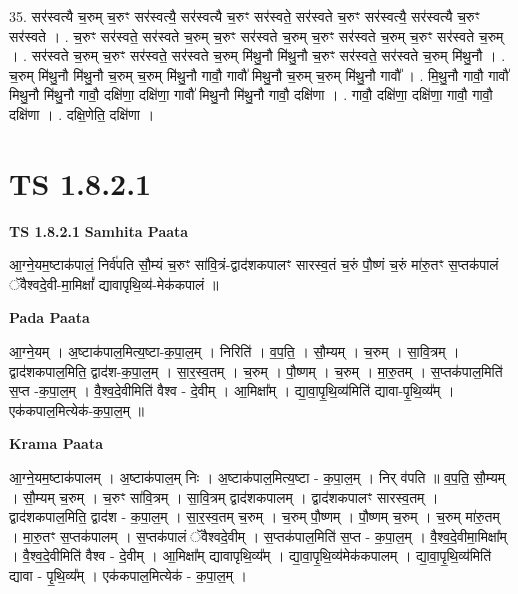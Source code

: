 \documentclass[17pt]{extarticle}
\begin{document}
35. सर॑स्वत्यै च॒रुम् च॒रुꣳ सर॑स्वत्यै॒ सर॑स्वत्यै च॒रुꣳ सर॑स्वते॒ सर॑स्वते च॒रुꣳ सर॑स्वत्यै॒ सर॑स्वत्यै च॒रुꣳ सर॑स्वते । . च॒रुꣳ सर॑स्वते॒ सर॑स्वते च॒रुम् च॒रुꣳ सर॑स्वते च॒रुम् च॒रुꣳ सर॑स्वते च॒रुम् च॒रुꣳ सर॑स्वते च॒रुम् । . सर॑स्वते च॒रुम् च॒रुꣳ सर॑स्वते॒ सर॑स्वते च॒रुम् मि॑थु॒नौ मि॑थु॒नौ च॒रुꣳ सर॑स्वते॒ सर॑स्वते च॒रुम् मि॑थु॒नौ । . च॒रुम् मि॑थु॒नौ मि॑थु॒नौ च॒रुम् च॒रुम् मि॑थु॒नौ गावौ॒ गावौ॑ मिथु॒नौ च॒रुम् च॒रुम् मि॑थु॒नौ गावौ᳚ । . मि॒थु॒नौ गावौ॒ गावौ॑ मिथु॒नौ मि॑थु॒नौ गावौ॒ दक्षि॑णा॒ दक्षि॑णा॒ गावौ॑ मिथु॒नौ मि॑थु॒नौ गावौ॒ दक्षि॑णा । . गावौ॒ दक्षि॑णा॒ दक्षि॑णा॒ गावौ॒ गावौ॒ दक्षि॑णा । . दक्षि॒णेति॒ दक्षि॑णा । \newline
\pagebreak
{}

\section{ TS 1.8.2.1 }

\textbf{TS 1.8.2.1 } \newline
\textbf{Samhita Paata} \newline

आ॒ग्ने॒यम॒ष्टाक॑पालं॒ निर्व॑पति सौ॒म्यं च॒रुꣳ सा॑वि॒त्रं-द्वाद॑शकपालꣳ सारस्व॒तं च॒रुं पौ॒ष्णं च॒रुं मा॑रु॒तꣳ स॒प्तक॑पालं ॅवैश्वदे॒वी-मा॒मिक्षां᳚ द्यावापृथि॒व्य॑-मेक॑कपालं ॥ \newline

\textbf{Pada Paata} \newline

आ॒ग्ने॒यम् । अ॒ष्टाक॑पाल॒मित्य॒ष्टा-क॒पा॒ल॒म् । निरिति॑ । व॒प॒ति॒ । सौ॒म्यम् । च॒रुम् । सा॒वि॒त्रम् । द्वाद॑शकपाल॒मिति॒ द्वाद॑श-क॒पा॒ल॒म् । सा॒र॒स्व॒तम् । च॒रुम् । पौ॒ष्णम् । च॒रुम् । मा॒रु॒तम् । स॒प्तक॑पाल॒मिति॑ स॒प्त -क॒पा॒ल॒म् । वै॒श्व॒दे॒वीमिति॑ वैश्व - दे॒वीम् । आ॒मिक्षा᳚म् । द्या॒वा॒पृ॒थि॒व्य॑मिति॑ द्यावा-पृ॒थि॒व्य᳚म् । एक॑कपाल॒मित्येक॑-क॒पा॒ल॒म् ॥  \newline


\textbf{Krama Paata} \newline

आ॒ग्ने॒यम॒ष्टाक॑पालम् । अ॒ष्टाक॑पाल॒म् निः । अ॒ष्टाक॑पाल॒मित्य॒ष्टा - क॒पा॒ल॒म् । निर् व॑पति ॥ व॒प॒ति॒ सौ॒म्यम् । सौ॒म्यम् च॒रुम् । च॒रुꣳ सा॑वि॒त्रम् । सा॒वि॒त्रम् द्वाद॑शकपालम् । द्वाद॑शकपालꣳ सारस्व॒तम् । द्वाद॑शकपाल॒मिति॒ द्वाद॑श - क॒पा॒ल॒म् । सा॒र॒स्व॒तम् च॒रुम् । च॒रुम् पौ॒ष्णम् । पौ॒ष्णम् च॒रुम् । च॒रुम् मा॑रु॒तम् । मा॒रु॒तꣳ स॒प्तक॑पालम् । स॒प्तक॑पालं ॅवैश्वदे॒वीम् । स॒प्तक॑पाल॒मिति॑ स॒प्त - क॒पा॒ल॒म् । वै॒श्व॒दे॒वीमा॒मिक्षा᳚म् । वै॒श्व॒दे॒वीमिति॑ वैश्व - दे॒वीम् । आ॒मिक्षा᳚म् द्यावापृथि॒व्य᳚म् । द्या॒वा॒पृ॒थि॒व्य॑मेक॑कपालम् । द्या॒वा॒पृ॒थि॒व्य॑मिति॑ द्यावा - पृ॒थि॒व्य᳚म् । एक॑कपाल॒मित्येक॑ - क॒पा॒ल॒म् । \newline
\end{document}
